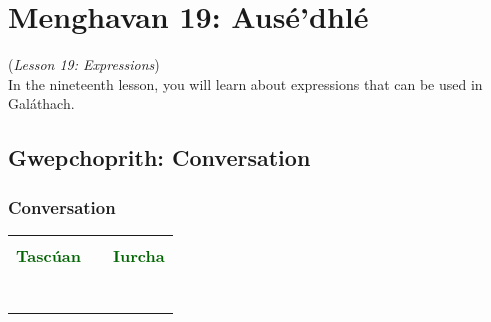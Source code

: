 \section{Menghavan 19: Aus\'{e'}dhl\'{e}}
(\textit{Lesson 19: Expressions})\\

In the nineteenth lesson, you will learn about expressions that can be used in Gal\'{a}thach.

\subsection{Gwepchoprith: Conversation}
\subsubsection{Conversation}

\begin{table}[H]
\centering
    \begin{tabular}{cM{10.0cm}c}
     &  & \\
    \textcolor{darkgreen}{\textbf{Tasc\'{u}an}} &  & \textcolor{darkgreen}{\textbf{Iurcha}}\\
     &  & \\
     &  & \\
     &  & \\
     &  & \\
     &  & \\
     &  & \\
     &  & 
    \end{tabular}
\end{table}

